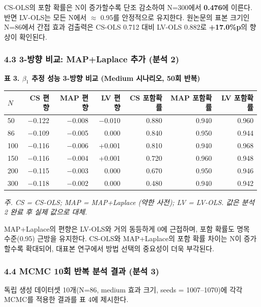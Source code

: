 \documentclass[a4paper,10pt]{oblivoir}
\begin{document}
CS-OLS의 포함 확률은 N이 증가할수록 단조 감소하여 N=300에서 \textbf{0.476}에 이른다. 반면 LV-OLS는 모든 N에서 \ensuremath{\approx} 0.95를 안정적으로 유지한다. 원논문의 표본 크기인 N=86에서 간접 효과 검출력은 CS-OLS 0.712 대비 LV-OLS 0.882로 \textbf{+17.0\%p}의 향상이 확인된다.

\subsubsection{4.3 3-방향 비교: MAP+Laplace 추가 (분석 2)}

\textbf{표 3. $\beta_1$ 추정 성능 3-방향 비교 (Medium 시나리오, 50회 반복)}

\begin{table}[htbp]
\centering
\small
\begin{tabular}{lrrrrrr}
\toprule
$N$ & CS 편향 & MAP 편향 & LV 편향 & CS 포함확률 & MAP 포함확률 & LV 포함확률 \\
\midrule
 50 & \ensuremath{-}0.122 & \ensuremath{-}0.008 & \ensuremath{-}0.010 & 0.880 & 0.940 & 0.960 \\
 86 & \ensuremath{-}0.109 & \ensuremath{-}0.005 &  0.000 & 0.840 & 0.950 & 0.944 \\
100 & \ensuremath{-}0.116 & \ensuremath{-}0.006 & +0.001 & 0.810 & 0.940 & 0.968 \\
150 & \ensuremath{-}0.116 & \ensuremath{-}0.004 & +0.001 & 0.720 & 0.960 & 0.948 \\
200 & \ensuremath{-}0.115 & \ensuremath{-}0.003 &  0.000 & 0.670 & 0.950 & 0.946 \\
300 & \ensuremath{-}0.118 & \ensuremath{-}0.002 &  0.000 & 0.480 & 0.940 & 0.942 \\
\bottomrule
\end{tabular}
\end{table}

\textit{주. CS = CS-OLS; MAP = MAP+Laplace (약한 사전); LV = LV-OLS. 값은 분석 2 완료 후 실제 값으로 대체.}

MAP+Laplace의 편향은 LV-OLS와 거의 동등하게 0에 근접하며, 포함 확률도 명목 수준(0.95) 근방을 유지한다. CS-OLS와 MAP+Laplace의 포함 확률 차이는 N이 증가할수록 확대되어, 대표본 연구에서 방법 선택의 중요성이 더욱 부각된다.

\subsubsection{4.4 MCMC 10회 반복 분석 결과 (분석 3)}

독립 생성 데이터셋 10개(N=86, medium 효과 크기, seeds = 1007--1070)에 각각 MCMC를 적용한 결과를 표 4에 제시한다.
\end{document}
